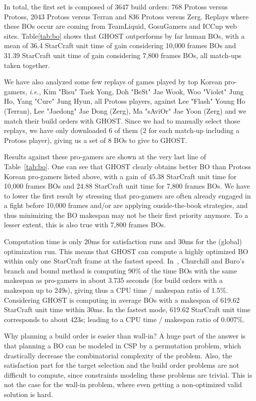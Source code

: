 \documentclass[journal]{IEEEtran}
\newcommand{\csp}{\textsc{CSP}\xspace}
\newcommand{\ghost}{\textsc{GHOST}\xspace}
\newcommand{\ie}{\textit{i.e.}}
\begin{document}
In total, the first set is  composed of 3647 build orders: 768 Protoss
versus  Protoss, 2043  Protoss versus  Terran and  836 Protoss  versus
Zerg.   Replays where  these  BOs occur  are  coming from  TeamLiquid,
GosuGamers and  ICCup web sites.  Table\ref{tab:bo}  shows that \ghost
outperforms by far human BOs, with  a mean of 36.4 StarCraft unit time
of gain considering 10,000 frames BOs and 31.39 StarCraft unit time of
gain considering 7,800 frames BOs, all match-ups taken together.

We have also  analyzed some few replays of games  played by top Korean
pro-gamers,  \ie, Kim  "Bisu"  Taek  Yong, Doh  "BeSt"  Jae Wook,  Woo
"Violet" Jung Ho, Yang "Cure"  Jung Hyun, all Protoss players, against
Lee  "Flash" Young  Ho (Terran),  Lee  "Jaedong" Jae  Dong (Zerg),  Ma
"sAviOr" Jae Yoon (Zerg) and we  match their build orders with \ghost.
Since we had to manually select those replays, we have only downloaded
6 of them (2 for each  match-up including a Protoss player), giving us
a set of 8 BOs to give to \ghost.

Results against  these pro-gamers are shown  at the very last  line of
Table~\ref{tab:bo}.  One can see that \ghost clearly obtains better BO
than  Protoss Korean  pro-gamers listed  above, with  a gain  of 45.38
StarCraft unit  time for  10,000 frames BOs  and 24.88  StarCraft unit
time  for 7,800  frames BOs.  We  have to  lower the  first result  by
stressing that pro-gamers are often  already engaged in a fight before
10,000 frames and/or are applying ouside-the-book strategies, and thus
minimizing the BO makespan may not be their first priority anymore. To
a lesser extent, this is also true with 7,800 frames BOs.

Computation time is  only 20ms for satisfaction runs and  30ms for the
(global) optimization run. This means that \ghost can compute a highly
optimized BO  within only one StarCraft frame  at the fastest
speed. In~\cite{ChurchillB11},  Churchill and Buro's branch  and bound
method  is computing  90\%  of the  time BOs  with the  same
makespan as pro-gamers in about 3.735 seconds (for build orders with a
makespan  up to  249s), giving  thus a  CPU time  / makespan  ratio of
1.5\%. Considering \ghost is computing  in average BOs with a
makespan of  619.62 StarCraft  unit time within  30ms. In  the fastest
mode, 619.62 StarCraft unit time corresponds to about 423s; leading to
a CPU time / makespan ratio of 0.007\%.

Why planning a build order is easier  than wall-in? A huge part of the
answer is  that planning  a BO can be modeled  in \csp  by a
permutation  problem,  which  drastically decrease  the  combinatorial
complexity of the problem. Also,  the satisfaction part for the target
selection and the  build order problems are not  difficult to compute,
since constraints  modeling these problems  are trivial.  This  is not
the case for  the wall-in problem, where even  getting a non-optimized
valid solution is hard.
\end{document}
